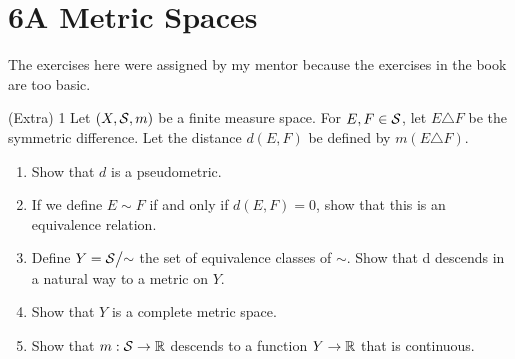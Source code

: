 \section{6A Metric Spaces}

The exercises here were assigned by my mentor because the exercises in the book are too basic.

\begin{exercise}{(Extra) 1}
Let $(X, \mathcal{S}, m)$ be a finite measure space. 
For $E, F \in \mathcal{S}$, let $E \triangle F$ be the symmetric difference. 
Let the distance $d(E,F)$ be defined by $m(E \triangle F)$. 
\begin{enumerate}
    \item Show that $d$ is a pseudometric.
    \item If we define $E \sim F$ if and only if $d(E,F) = 0$, show that this is an equivalence relation.
    \item Define $Y = {\textstyle \mathcal{S}}\big/{\textstyle \sim}$ the set of equivalence classes of $\sim$. 
    Show that d descends in a natural way to a metric on $Y$.
    \item Show that $Y$ is a complete metric space.
    \item Show that $m:\mathcal{S} \to \mathbb{R}$ descends to a function $Y \to \mathbb{R}$ that is continuous.
\end{enumerate}
\end{exercise}
